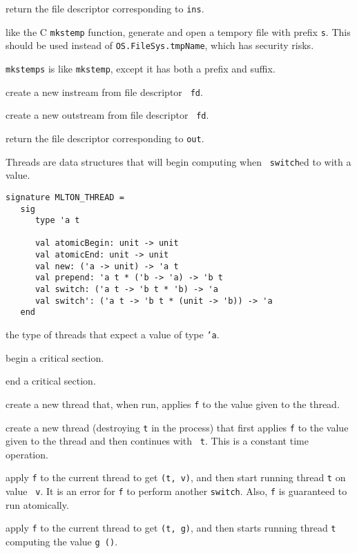 \begin{description}

 return the file descriptor corresponding to
{\tt ins}.

like the C {\tt mkstemp} function, generate and open a tempory file with prefix
{\tt s}.  This should be used instead of {\tt OS.FileSys.tmpName}, which has
security risks.

{\tt mkstemps} is like {\tt mkstemp}, except it has both a prefix and suffix.

 create a new instream from file descriptor {\tt 
fd}.

 create a new outstream from file descriptor {\tt 
fd}.

 return the file descriptor corresponding to
{\tt out}.
\end{description}

Threads are data structures that will begin computing when {\tt
switch}ed to with a value.
\begin{verbatim}
signature MLTON_THREAD =
   sig
      type 'a t

      val atomicBegin: unit -> unit
      val atomicEnd: unit -> unit
      val new: ('a -> unit) -> 'a t
      val prepend: 'a t * ('b -> 'a) -> 'b t
      val switch: ('a t -> 'b t * 'b) -> 'a
      val switch': ('a t -> 'b t * (unit -> 'b)) -> 'a
   end
\end{verbatim}

\begin{description}

the type of threads that expect a value of type {\tt 'a}.

begin a critical section.

end a critical section.

create a new thread that, when run, applies {\tt f} to the
value given to the thread. 

create a new thread (destroying {\tt t} in the process) that first applies
{\tt f} to the value given to the thread and then continues with {\tt
t}.  This is a constant time operation.

apply {\tt f} to the current thread to get
{\tt (t, v)}, and then start running thread {\tt t} on value {\tt
v}.  It is an error for {\tt f} to perform another {\tt switch}.  Also, {\tt f}
is guaranteed to run atomically.

apply {\tt f} to the current thread to get
{\tt (t, g)}, and then starts running thread {\tt t} computing the
value {\tt g ()}.

\end{description}


